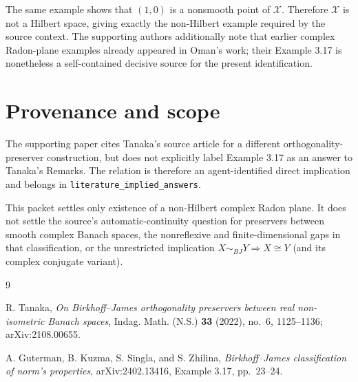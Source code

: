 \documentclass[11pt]{article}
\begin{document}
The same example shows that $(1,0)$ is a nonsmooth point of $\mathcal X$.
Therefore $\mathcal X$ is not a Hilbert space, giving exactly the non-Hilbert
example required by the source context.  The supporting authors additionally
note that earlier complex Radon-plane examples already appeared in Oman's
work; their Example 3.17 is nonetheless a self-contained decisive source for
the present identification.

\section*{Provenance and scope}

The supporting paper cites Tanaka's source article for a different
orthogonality-preserver construction, but does not explicitly label Example
3.17 as an answer to Tanaka's Remarks.  The relation is therefore an
agent-identified direct implication and belongs in
\texttt{literature\_implied\_answers}.

This packet settles only existence of a non-Hilbert complex Radon plane.  It
does not settle the source's automatic-continuity question for preservers
between smooth complex Banach spaces, the nonreflexive and finite-dimensional
gaps in that classification, or the unrestricted implication
$X\sim_{BJ}Y\Rightarrow X\cong Y$ (and its complex conjugate variant).

\begin{thebibliography}{9}

R. Tanaka,
\emph{On Birkhoff--James orthogonality preservers between real non-isometric
Banach spaces},
Indag. Math. (N.S.) \textbf{33} (2022), no.~6, 1125--1136;
arXiv:2108.00655.

A. Guterman, B. Kuzma, S. Singla, and S. Zhilina,
\emph{Birkhoff--James classification of norm's properties},
arXiv:2402.13416, Example 3.17, pp.~23--24.

\end{thebibliography}
\end{document}
